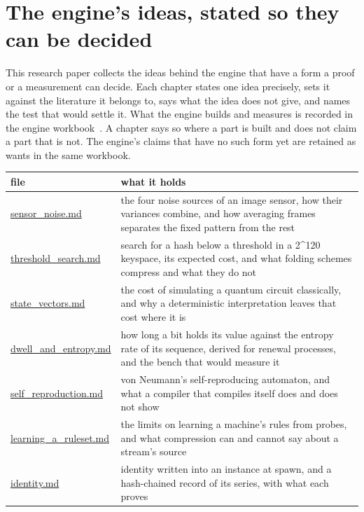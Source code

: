 \chapter{\texorpdfstring{The engine's ideas, stated so they can be decided}{The engine's ideas, stated so they can be decided}}
\label{chap:readme}

This research paper collects the ideas behind the engine that have a form a proof or a measurement can decide. Each chapter states one idea precisely, sets it against the literature it belongs to, says what the idea does not give, and names the test that would settle it. What the engine builds and measures is recorded in the engine workbook~\cite{src:Quigg-engine-workbook}. A chapter says so where a part is built and does not claim a part that is not. The engine's claims that have no such form yet are retained as wants in the same workbook.

{\small
\setlength{\tabcolsep}{6pt}
\begin{longtable}{>{\RaggedRight\arraybackslash}p{}>{\RaggedRight\arraybackslash}p{}}
\toprule
file & what it holds \\
\midrule
\endhead
\hyperref[chap:sensor-noise]{sensor\_\allowbreak{}noise.md} & the four noise sources of an image sensor, how their variances combine, and how averaging frames separates the fixed pattern from the rest \\
\hyperref[chap:threshold-search]{threshold\_\allowbreak{}search.md} & search for a hash below a threshold in a 2\textasciicircum{}120 keyspace, its expected cost, and what folding schemes compress and what they do not \\
\hyperref[chap:state-vectors]{state\_\allowbreak{}vectors.md} & the cost of simulating a quantum circuit classically, and why a deterministic interpretation leaves that cost where it is \\
\hyperref[chap:dwell-and-entropy]{dwell\_\allowbreak{}and\_\allowbreak{}entropy.md} & how long a bit holds its value against the entropy rate of its sequence, derived for renewal processes, and the bench that would measure it \\
\hyperref[chap:self-reproduction]{self\_\allowbreak{}reproduction.md} & von Neumann's self-reproducing automaton, and what a compiler that compiles itself does and does not show \\
\hyperref[chap:learning-a-ruleset]{learning\_\allowbreak{}a\_\allowbreak{}ruleset.md} & the limits on learning a machine's rules from probes, and what compression can and cannot say about a stream's source \\
\hyperref[chap:identity]{identity.md} & identity written into an instance at spawn, and a hash-chained record of its series, with what each proves \\
\bottomrule
\end{longtable}
}
